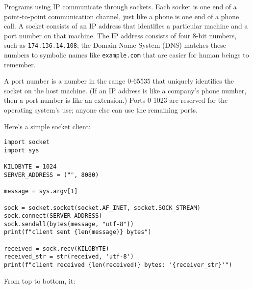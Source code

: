 \documentclass{scrbook}
\begin{document}
Programs using IP communicate through sockets.
Each socket is one end of a point-to-point communication channel,
just like a phone is one end of a phone call.
A socket consists of an IP address that identifies a particular machine
and a port number on that machine.
The IP address consists of four 8-bit numbers,
such as \texttt{174.136.14.108};
the Domain Name System (DNS) matches these numbers to symbolic names like \texttt{example.com}
that are easier for human beings to remember.


A port number is a number in the range 0-65535
that uniquely identifies the socket on the host machine.
(If an IP address is like a company's phone number,
then a port number is like an extension.)
Ports 0-1023 are reserved for the operating system's use;
anyone else can use the remaining ports.


Here's a simple socket client:


\begin{lstlisting}[frame=single,frameround=tttt]
import socket
import sys

KILOBYTE = 1024
SERVER_ADDRESS = ("", 8080)

message = sys.argv[1]

sock = socket.socket(socket.AF_INET, socket.SOCK_STREAM)
sock.connect(SERVER_ADDRESS)
sock.sendall(bytes(message, "utf-8"))
print(f"client sent {len(message)} bytes")

received = sock.recv(KILOBYTE)
received_str = str(received, 'utf-8')
print(f"client received {len(received)} bytes: '{receiver_str}'")
\end{lstlisting}



From top to bottom, it:
\end{document}

